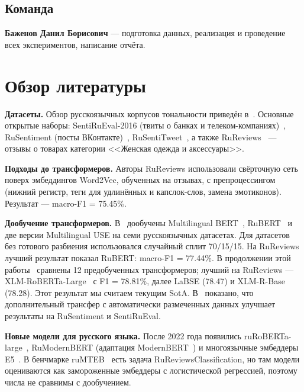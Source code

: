 \documentclass{article}
\begin{document}
\subsection{Команда}
\textbf{Баженов Данил Борисович} --- подготовка данных, реализация и проведение всех экспериментов, написание отчёта.

\section{Обзор литературы}
\label{sec:related}
\textbf{Датасеты.} Обзор русскоязычных корпусов тональности приведён в~\cite{kotelnikov2021landscape}. Основные открытые наборы: SentiRuEval-2016 (твиты о банках и телеком-компаниях)~\cite{loukachevitch2016sentirueval}, RuSentiment (посты ВКонтакте)~\cite{rogers2018rusentiment}, RuSentiTweet~\cite{smetanin2022rusentitweet}, а также RuReviews~\cite{smetanin2019rureviews} --- отзывы о товарах категории <<Женская одежда и аксессуары>>.

\textbf{Подходы до трансформеров.} Авторы RuReviews использовали свёрточную сеть~\cite{kim2014cnn} поверх эмбеддингов Word2Vec, обученных на отзывах, с препроцессингом (нижний регистр, теги для удлинённых и капслок-слов, замена эмотиконов). Результат --- macro-F1 = 75.45\%.

\textbf{Дообучение трансформеров.} В~\cite{smetanin2021deep} дообучены Multilingual BERT~\cite{devlin2019bert}, RuBERT~\cite{kuratov2019rubert} и две версии Multilingual USE на семи русскоязычных датасетах. Для датасетов без готового разбиения использовался случайный сплит 70/15/15. На RuReviews лучший результат показал RuBERT: macro-F1 = 77.44\%. В продолжении этой работы~\cite{smetanin2022transformers} сравнены 12 предобученных трансформеров; лучший на RuReviews --- XLM-RoBERTa-Large~\cite{conneau2020xlmr} с F1 = 78.81\%, далее LaBSE (78.47) и XLM-R-Base (78.28). Этот результат мы считаем текущим SotA. В~\cite{golubev2021transfer} показано, что дополнительный трансфер с автоматически размеченных данных улучшает результаты на RuSentiment и SentiRuEval.

\textbf{Новые модели для русского языка.} После 2022 года появились ruRoBERTa-large~\cite{zmitrovich2023family}, RuModernBERT (адаптация ModernBERT~\cite{warner2024modernbert}) и многоязычные эмбеддеры E5~\cite{wang2024me5}. В бенчмарке ruMTEB~\cite{snegirev2025rumteb} есть задача RuReviewsClassification, но там модели оцениваются как замороженные эмбеддеры с логистической регрессией, поэтому числа не сравнимы с дообучением.
\end{document}
